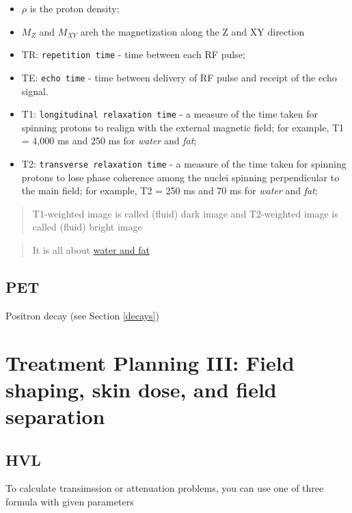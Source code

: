 \documentclass[]{book}
\providecommand{\tightlist}{%
  \setlength{\itemsep}{0pt}\setlength{\parskip}{0pt}}
\theoremstyle{definition}
\theoremstyle{definition}
\theoremstyle{definition}
\theoremstyle{remark}
\begin{document}
\begin{itemize}
\tightlist
\item
  \(\rho\) is the proton density;
\item
  \(M_Z\) and \(M_{XY}\) areh the magnetization along the Z and XY
  direction
\item
  TR: \texttt{repetition\ time} - time between each RF pulse;
\item
  TE: \texttt{echo\ time} - time between delivery of RF pulse and
  receipt of the echo signal.
\item
  T1: \texttt{longitudinal\ relaxation\ time} - a measure of the time
  taken for spinning protons to realign with the external magnetic
  field; for example, T1 = 4,000 ms and 250 ms for \emph{water} and
  \emph{fat};
\item
  T2: \texttt{transverse\ relaxation\ time} - a measure of the time
  taken for spinning protons to lose phase coherence among the nuclei
  spinning perpendicular to the main field; for example, T2 = 250 ms and
  70 ms for \emph{water} and \emph{fat};
\end{itemize}

\begin{quote}
T1-weighted image is called (fluid) dark image and T2-weighted image is
called (fluid) bright image
\end{quote}

\begin{quote}
It is all about
\href{https://www.radiologymasterclass.co.uk/tutorials/mri/t1_and_t2_images}{water
and fat}
\end{quote}

\section{PET}\label{pet}

Positron decay (see Section \ref{decays})

\chapter{Treatment Planning III: Field shaping, skin dose, and field
separation}\label{planning3}

\section{HVL}\label{hvl}

To calculate transimssion or attenuation problems, you can use one of
three formula with given parameters
\end{document}

